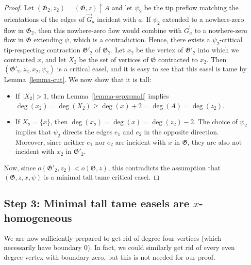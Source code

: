 \documentclass{article}
\newcommand\g{\mathfrak{G}}
\begin{document}
\begin{proof}
Let $(\g_2,z_2)=(\g,z)\restriction A$ and let $\psi_2$ be the tip preflow matching the orientations of the edges of $\vec{G}_a$ incident with $a$.
If $\psi_2$ extended to a nowhere-zero flow in $\g_2$, then this nowhere-zero flow would combine with $\vec{G}_a$
to a nowhere-zero flow in $\g$ extending $\psi$, which is a contradiction.  Hence, there exists a $\psi_2$-critical tip-respecting contraction $\g'_2$
of $\g_2$.  Let $x_2$ be the vertex of $\g'_2$ into which we contracted $x$, and let $X_2$ be the set of vertices of $\g$ contracted to $x_2$.
Then $(\g'_2,z_2,x_2,\psi_2)$ is a critical easel, and it is easy to see that this easel is tame by Lemma~\ref{lemma-cut}. We now show that it is tall:
\begin{itemize}
\item If $|X_2|>1$, then Lemma~\ref{lemma-sepxsmall} implies $\deg(x_2)=\deg(X_2)\ge \deg(x)+2=\deg(A)=\deg(z_2)$.
\item If $X_2=\{x\}$, then $\deg(x_2)=\deg(x)=\deg(z_2)-2$. The choice of $\psi_2$ implies that $\psi_2$ directs the edges $e_1$ and $e_2$
in the opposite direction.  Moreover, since neither $e_1$ nor $e_2$ are incident with $x$ in $\g$, they are also not incident with $x_2$
in $\g'_2$.
\end{itemize}
Now, since $o(\g'_2,z_2)<o(\g,z)$, this contradicts the assumption that $(\g,z,x,\psi)$ is a minimal tall tame critical easel.
\end{proof}

\subsection{Step 3: Minimal tall tame easels are $x$-homogeneous}

We are now sufficiently prepared to get rid of degree four vertices (which necessarily have boundary $0$). In fact, we could similarly get rid of every even degree vertex with boundary zero, but this is not needed for our proof.
\end{document}
